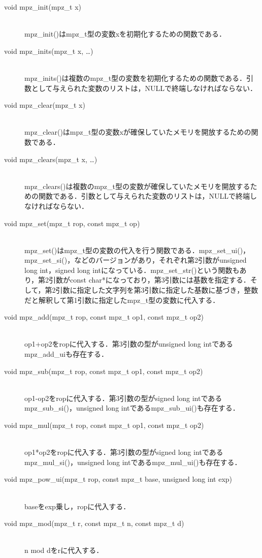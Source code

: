 \documentclass[openany,11pt,papersize]{jsbook}
\begin{document}
\begin{description}
 \item[void mpz\_init(mpz\_t x)]\mbox{}\\ 
mpz\_init()はmpz\_t型の変数xを初期化するための関数である．

\item[void mpz\_inits(mpz\_t x, …)]\mbox{}\\ 
mpz\_inits()は複数のmpz\_t型の変数を初期化するための関数である．引数として与えられた変数のリストは，NULLで終端しなければならない．

\item[void mpz\_clear(mpz\_t x)]\mbox{}\\ 
mpz\_clear()はmpz\_t型の変数xが確保していたメモリを開放するための関数である．

\item[void mpz\_clears(mpz\_t x, …)]\mbox{}\\ 
mpz\_clears()は複数のmpz\_t型の変数が確保していたメモリを開放するための関数である．引数として与えられた変数のリストは，NULLで終端しなければならない．

\item[void mpz\_set(mpz\_t rop, const mpz\_t op)]\mbox{}\\ 
mpz\_set()はmpz\_t型の変数の代入を行う関数である．mpz\_set\_ui()，mpz\_set\_si()，などのバージョンがあり，それぞれ第2引数がunsigned long int，signed long intになっている．mpz\_set\_str()という関数もあり，第2引数がconst char*になっており，第3引数には基数を指定する．そして，第2引数に指定した文字列を第3引数に指定した基数に基づき，整数だと解釈して第1引数に指定したmpz\_t型の変数に代入する．

\item[void mpz\_add(mpz\_t rop, const mpz\_t op1, const mpz\_t op2)]\mbox{}\\ 
op1+op2をropに代入する．第3引数の型がunsigned long intであるmpz\_add\_uiも存在する．

\item[void mpz\_sub(mpz\_t rop, const mpz\_t op1, const mpz\_t op2)]\mbox{}\\ 
op1-op2をropに代入する．第3引数の型がsigned long intであるmpz\_sub\_si()，unsigned long intであるmpz\_sub\_ui()も存在する．

\item[void mpz\_mul(mpz\_t rop, const mpz\_t op1, const mpz\_t op2)]\mbox{}\\ 
op1*op2をropに代入する．第3引数の型がsigned long intであるmpz\_mul\_si()，unsigned long intであるmpz\_mul\_ui()も存在する．
	
\item[void mpz\_pow\_ui(mpz\_t rop, const mpz\_t base, unsigned long int exp)]\mbox{}\\ 
baseをexp乗し，ropに代入する．

\item[void mpz\_mod(mpz\_t r, const mpz\_t n, const mpz\_t d)]\mbox{}\\ 
n mod dをrに代入する．
\end{description}
\end{document}

